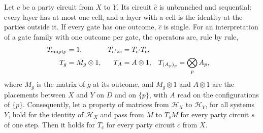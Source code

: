 \begin{theorem}
    \label{thm:party_circuit_op}
    \leanok
    Let $c$ be a party circuit from $X$ to $Y$. Its circuit $\widehat c$ is unbranched
    and sequential: every layer has at most one cell, and a layer with a cell is the
    identity at the parties outside it. If every gate has one outcome, $\widehat c$ is
    single. For an interpretation of a gate family with one outcome per gate, the
    operators are, rule by rule,
    \begin{align}
        T_{\mathrm{empty}} & =1,                           &
        T_{c'\circ c}      & =T_{c'}T_c,            \notag   \\
        T_g                & =M_g\otimes1,                 &
        T_A                & =A\otimes1,                   &
        T_{(A_p)_p}        & =\bigotimes_pA_p,    \notag
    \end{align}
    where $M_g$ is the matrix of $g$ at its outcome, and $M_g\otimes1$ and $A\otimes1$
    are the placements between $X$ and $Y$ on $D$ and on $\{p\}$, with $A$ read on the
    configurations of $\{p\}$. Consequently, let a property of matrices from
    $\mathcal H_X$ to $\mathcal H_Y$, for all systems $Y$, hold for the identity of
    $\mathcal H_X$ and pass from $M$ to $T_sM$ for every party circuit $s$ of one step.
    Then it holds for $T_c$ for every party circuit $c$ from $X$.
\end{theorem}
